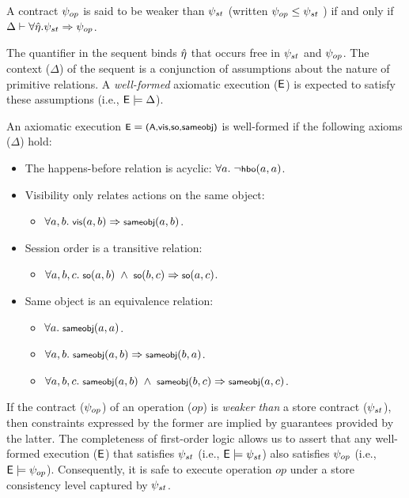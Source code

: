 \begin{definition}
A contract $\psi_{op}$ is said to be weaker than $\psi_{st}$ (written $\psi_{op}
\le \psi_{st}$ ) if and only if $\Delta \vdash \forall \hat{\eta}.
\psi_{st} \Rightarrow \psi_{op}$.
\end{definition}

The quantifier in the sequent binds $\hat{\eta}$ that occurs free in $\psi_{st}$
and $\psi_{op}$. The context ($\Delta$) of the sequent is a conjunction of
assumptions about the nature of primitive relations. A \emph{well-formed}
axiomatic execution (${\normalfont \textsf{E}}$) is expected to satisfy these assumptions (i.e., ${\normalfont \textsf{E}}
\models \Delta$).

\begin{definition}
An axiomatic execution $\small \E = \Exec$ is well-formed if the
following axioms ($\Delta$) hold:

\begin{itemize}
\item The happens-before relation is acyclic: $\small \forall a.~\neg\hbo{a}{a}$.
\item Visibility only relates actions on the same object:
	\begin{itemize}
	\item $\small \forall a,b.~\vis{a}{b} \Rightarrow \sameobj{a}{b}$.
	\end{itemize}
\item Session order is a transitive relation:
	\begin{itemize}
	\item $\small \forall a,b,c.~\so{a}{b} ~\wedge~ \so{b}{c} \Rightarrow \so{a}{c}$.
	\end{itemize}
\item Same object is an equivalence relation:
	\begin{itemize}
	\item $\small \forall a.~\sameobj{a}{a}$.
	\item $\small \forall a,b.~\sameobj{a}{b} \Rightarrow \sameobj{b}{a}$.
	\item $\small \forall a,b,c.~\sameobj{a}{b} ~\wedge~ \sameobj{b}{c} \Rightarrow \sameobj{a}{c}$.
	\end{itemize}
\end{itemize}
\end{definition}

If the contract ($\psi_{op}$) of an operation ($\mathit{op}$) is \emph{weaker
than} a store contract ($\psi_{st}$), then constraints expressed by the former
are implied by guarantees provided by the latter. The completeness of
first-order logic allows us to assert that any well-formed execution (${\normalfont \textsf{E}}$)
that satisfies $\psi_{st}$ (i.e., ${\normalfont \textsf{E}}\models \psi_{st}$) also satisfies
$\psi_{op}$ (i.e., ${\normalfont \textsf{E}} \models \psi_{op}$). Consequently, it is safe to execute
operation $\mathit{op}$ under a store consistency level captured by $\psi_{st}$.


